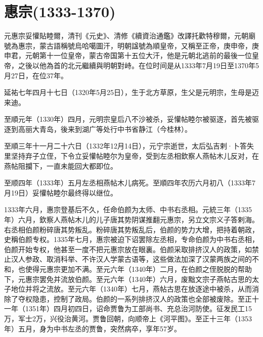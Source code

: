 
\section{惠宗\tiny(1333-1370)}

元惠宗妥懽貼睦爾，清刊《元史》、清修《續資治通鑑》改譯托歡特穆爾，元朝廟號為惠宗，蒙古語稱號烏哈噶圖汗，明朝諡號為順皇帝，又稱至正帝，庚申帝，庚申君，元朝第十一位皇帝，蒙古帝国第十五位大汗，他是元朝北逃前的最後一位皇帝，之後以他為首的北元繼續與明朝對峙。在位时间是从1333年7月19日至1370年5月27日，在位37年。

延祐七年四月十七日（1320年5月25日），生于北方草原，生父是元明宗，生母是迈来迪。

至順元年（1330年）四月，元明宗皇后八不沙被杀，妥懽帖睦尔被驱逐，首先被驱逐到高丽大青岛，後来到湖广等处行中书省静江（今桂林）。

至順三年十一月二十六日（1332年12月14日），元宁宗逝世，太后弘吉剌·卜答失里坚持弃子立侄，下令立妥懽帖睦尔为皇帝，受到左丞相欽察人燕帖木儿反对，在燕帖阻攔下，一直未能回大都即位。

至顺四年（1333年）五月左丞相燕帖木儿病死。至順四年农历六月初八（1333年7月19日）妥懽帖睦尔最终得以继位。

1333年六月，惠宗登基后不久，任命伯颜为太师、中书右丞相。元統三年（1335年）六月，欽察人燕帖木儿的儿子唐其势阴谋推翻元惠宗，另立文宗义子答剌海。右丞相伯颜粉碎唐其势叛乱。粉碎唐其势叛乱后，伯颜的势力大增，把持着朝政，史稱伯颜专权。1335年七月，惠宗被迫下诏罢除左丞相，专命伯颜为中书右丞相，伯颜开始专权，他甚至一度不把元惠宗放在眼裏。伯颜采取排挤汉人的政策，如禁止汉人参政、取消科举、不许汉人学蒙古语等，这些做法加深了汉蒙两族之间的不和，也使得元惠宗更加不满。至元六年（1340年）二月，在伯颜之侄脱脱的帮助下，元惠宗罢免并流放伯颜。至元六年（1340年）六月，废黜文宗子燕帖古思的太子地位并将之流放。至元六年（1340年）七月，燕帖古思在放逐途中被杀，从而消除了夺权隐患，控制了政局。伯颜的一系列排挤汉人的政策也全部被废除。至正十一年（1351年）四月初四日，诏命贾鲁为工部尚书、充总治河防使。征发民工15万，军士2万，兴役治黄河。贾鲁回朝，向顺帝上《河平图》。至正十三年（1353年）五月，身为中书左丞的贾鲁，突然病卒，享年57岁。


